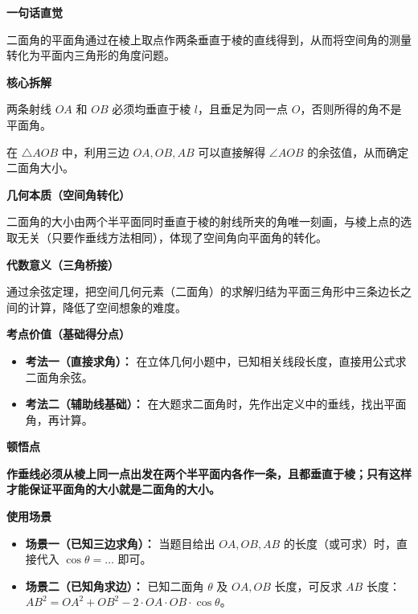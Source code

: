 \begin{explanationbox}
	\textbf{\textcolor{CExplanation}{一句话直觉}}

	二面角的平面角通过在棱上取点作两条垂直于棱的直线得到，从而将空间角的测量转化为平面内三角形的角度问题。

	\medskip
	\textbf{\textcolor{CExplanation}{核心拆解}}
	\begin{description}[style=nextline, leftmargin=2.8em, labelsep=0.5em, itemsep=0.45em]
		\item[\textbf{要点一（垂线条件）：}] 两条射线 $OA$ 和 $OB$ 必须均垂直于棱 $l$，且垂足为同一点 $O$，否则所得的角不是平面角。
		\item[\textbf{要点二（余弦定理）：}] 在 $\triangle AOB$ 中，利用三边 $OA, OB, AB$ 可以直接解得 $\angle AOB$ 的余弦值，从而确定二面角大小。
	\end{description}

	\medskip
	\textbf{\textcolor{CExplanation}{几何本质（空间角转化）}}

	二面角的大小由两个半平面同时垂直于棱的射线所夹的角唯一刻画，与棱上点的选取无关（只要作垂线方法相同），体现了空间角向平面角的转化。

	\medskip
	\textbf{\textcolor{CExplanation}{代数意义（三角桥接）}}

	通过余弦定理，把空间几何元素（二面角）的求解归结为平面三角形中三条边长之间的计算，降低了空间想象的难度。

	\medskip
	\textbf{\textcolor{CExplanation}{考点价值（基础得分点）}}
	\begin{itemize}[leftmargin=*, itemsep=0.5em, topsep=0.4em]
		\item \textbf{考法一（直接求角）：} 在立体几何小题中，已知相关线段长度，直接用公式求二面角余弦。
		\item \textbf{考法二（辅助线基础）：} 在大题求二面角时，先作出定义中的垂线，找出平面角，再计算。
	\end{itemize}

	\medskip
	\textbf{\textcolor{CExplanation}{顿悟点}}

	\textbf{作垂线必须从棱上同一点出发在两个半平面内各作一条，且都垂直于棱；只有这样才能保证平面角的大小就是二面角的大小。}

	\medskip
	\textbf{\textcolor{CExplanation}{使用场景}}
	\begin{itemize}[leftmargin=*, itemsep=0.5em, topsep=0.4em]
		\item \textbf{场景一（已知三边求角）：} 当题目给出 $OA, OB, AB$ 的长度（或可求）时，直接代入 $\cos\theta = \dots$ 即可。
		\item \textbf{场景二（已知角求边）：} 已知二面角 $\theta$ 及 $OA, OB$ 长度，可反求 $AB$ 长度：$AB^2 = OA^2+OB^2-2\cdot OA\cdot OB\cdot\cos\theta$。
	\end{itemize}
\end{explanationbox}

